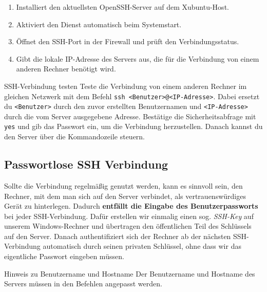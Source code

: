 \begin{enumerate}
    \item Installiert den aktuellsten OpenSSH-Server auf dem Xubuntu-Host.
    \item Aktiviert den Dienst automatisch beim Systemstart.
    \item Öffnet den SSH-Port in der Firewall und prüft den Verbindungsstatus.
    \item Gibt die lokale IP-Adresse des Servers aus, die für die Verbindung von einem anderen Rechner benötigt wird.
\end{enumerate}

\begin{InfoBox}{SSH-Verbindung testen}
    \scriptsize Teste die Verbindung von einem anderen Rechner im gleichen Netzwerk mit dem Befehl \texttt{ssh <Benutzer>@<IP-Adresse>}. Dabei ersetzt du \texttt{<Benutzer>} durch den zuvor erstellten Benutzernamen und \texttt{<IP-Adresse>} durch die vom Server ausgegebene Adresse. Bestätige die Sicherheitsabfrage mit \texttt{yes} und gib das Passwort ein, um die Verbindung herzustellen. Danach kannst du den Server über die Kommandozeile steuern.
\end{InfoBox}

\subsection{Passwortlose SSH Verbindung}

Sollte die Verbindung regelmäßig genutzt werden, kann es sinnvoll sein, den Rechner, mit dem man sich auf den Server verbindet, als vertrauenswürdiges Gerät zu hinterlegen. Dadurch \textbf{entfällt die Eingabe des Benutzerpassworts} bei jeder SSH-Verbindung. 
Dafür erstellen wir einmalig einen sog. \textit{SSH-Key} auf unserem Windows-Rechner und übertragen den öffentlichen Teil des Schlüssels auf den Server. Danach authentifiziert sich der Rechner ab der nächsten SSH-Verbindung automatisch durch seinen privaten Schlüssel, ohne dass wir das eigentliche Passwort eingeben müssen.



\begin{InfoBox}{Hinweis zu Benutzername und Hostname}
    \scriptsize Der Benutzername und Hostname des Servers müssen in den Befehlen angepasst werden.
\end{InfoBox}

